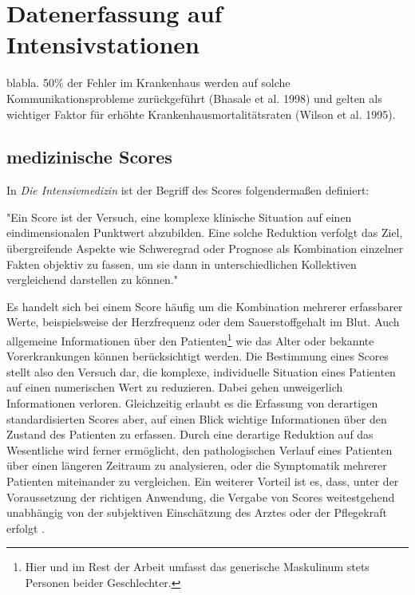 \section{Datenerfassung auf Intensivstationen}

blabla. 50\% der Fehler im Krankenhaus werden auf solche Kommunikationsprobleme zurückgeführt (Bhasale et al. 1998) und gelten als wichtiger Faktor für erhöhte Krankenhausmortalitätsraten (Wilson et al. 1995).

\subsection{medizinische Scores} \label{section:scores}

In \textit{Die Intensivmedizin} \citep{marxIntensivmedizin2015c} ist der Begriff des Scores folgendermaßen definiert:

\begin{itquote}
    "Ein Score ist der Versuch, eine komplexe klinische Situation auf einen eindimensionalen Punktwert abzubilden. Eine solche Reduktion verfolgt das Ziel, übergreifende Aspekte wie Schweregrad oder Prognose als Kombination einzelner Fakten objektiv zu fassen, um sie dann in unterschiedlichen Kollektiven vergleichend darstellen zu können."
\end{itquote}

Es handelt sich bei einem Score häufig um die Kombination mehrerer erfassbarer Werte, beispielsweise der Herzfrequenz oder dem Sauerstoffgehalt im Blut. Auch allgemeine Informationen über den Patienten\footnote{Hier und im Rest der Arbeit umfasst das generische Maskulinum stets Personen beider Geschlechter.} wie das Alter oder bekannte Vorerkrankungen können berücksichtigt werden. Die Bestimmung eines Scores stellt also den Versuch dar, die komplexe, individuelle Situation eines Patienten auf einen numerischen Wert zu reduzieren. Dabei gehen unweigerlich Informationen verloren. Gleichzeitig erlaubt es die Erfassung von derartigen standardisierten Scores aber, auf einen Blick wichtige Informationen über den Zustand des Patienten zu erfassen. Durch eine derartige Reduktion auf das Wesentliche wird ferner ermöglicht, den pathologischen Verlauf eines Patienten über einen längeren Zeitraum zu analysieren, oder die Symptomatik mehrerer Patienten miteinander zu vergleichen. Ein weiterer Vorteil ist es, dass, unter der Voraussetzung der richtigen Anwendung, die Vergabe von Scores weitestgehend unabhängig von der subjektiven Einschätzung des Arztes oder der Pflegekraft erfolgt \citep{marxIntensivmedizin2015c}.

